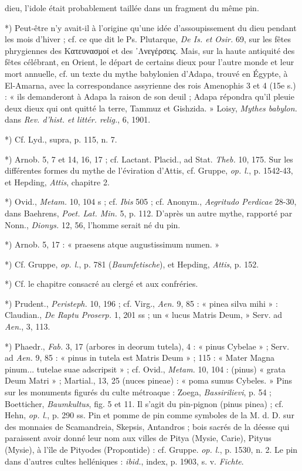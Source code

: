 \documentclass[a4paper, 11pt, oneside, polutonikogreek, french]{article}
\begin{document}
dieu, l'idole était probablement taillée dans un fragment du même pin.

*) Peut-être n'y avait-il à l'origine qu'une idée d'assoupissement du dieu pendant les mois d'hiver ; cf. ce que dit le Ps. Plutarque, \emph{De Is. et Osir.} 69, sur les fêtes phrygiennes des Kατευνασμοί et des ᾿Λνεγέρσεις. Mais, sur la haute antiquité des fêtes célébrant, en Orient, le départ de certains dieux pour l'autre monde et leur mort annuelle, cf. un texte du mythe babylonien d'Adapa, trouvé en Égypte, à El-Amarna, avec la correspondance assyrienne des rois Amenophis 3 et 4 (15e s.) : « ils demanderont à Adapa la raison de son deuil ; Adapa répondra qu'il pleuie deux dieux qui ont quitté la terre, Tammuz et Gishzida. » Loisy, \emph{Mythes babylon.} dans \emph{Rev. d'hist. et littér. relig.}, 6, 1901.

*) Cf. Lyd., supra, p. 115, n. 7.

*) Arnob. 5, 7 et 14, 16, 17 ; cf. Lactant. Placid., ad Stat. \emph{Theb.} 10, 175. Sur les différentes formes du mythe de l'éviration d'Attis, cf. Gruppe, \emph{op. l.}, p. 1542-43, et Hepding, \emph{Attis}, chapitre 2.

*) Ovid., \emph{Metam.} 10, 104 s ; cf. \emph{Ibis} 505 ; cf. Anonym., \emph{Aegritudo Perdicae} 28-30, dans Baehrens, \emph{Poet. Lat. Min.} 5, p. 112. D'après un autre mythe, rapporté par Nonn., \emph{Dionys.} 12, 56, l'homme serait né du pin.

*) Arnob. 5, 17 : « praesens atque augustissimum numen. »

*) Cf. Gruppe, \emph{op. l.}, p. 781 (\emph{Baumfetische}), et Hepding, \emph{Attis}, p. 152.

*) Cf. le chapitre consacré au clergé et aux confréries.

*) Prudent., \emph{Peristeph.} 10, 196 ; cf. Virg., \emph{Aen.} 9, 85 : « pinea silva mihi » : Claudian., \emph{De Raptu Proserp.} 1, 201 ss ; un « lucus Matris Deum, » Serv. ad \emph{Aen.}, 3, 113.

*) Phaedr., \emph{Fab.} 3, 17 (arbores in deorum tutela), 4 : « pinus Cybelae » ; Serv. ad \emph{Aen.} 9, 85 : « pinus in tutela est Matris Deum » ; 115 : « Mater Magna pinum... tutelae suae adscripsit » ; cf. Ovid., \emph{Metam.} 10, 104 : (pinus) « grata Deum Matri » ; Martial., 13, 25 (nuces pineae) : « poma sumus Cybeles. » Pins sur les monuments figurés du culte métroaque : Zoega, \emph{Bassirilievi}, p. 54 ; Boetticher, \emph{Baumkultus}, fig. 5 et 11. Il s'agit du pin-pignon (pinus pinea) ; cf. Hehn, \emph{op. l.}, p. 290 ss. Pin et pomme de pin comme symboles de la M. d. D. sur des monnaies de Scamandreia, Skepsis, Antandros ; bois sacrés de la déesse qui paraissent avoir donné leur nom aux villes de Pitya (Mysie, Carie), Pityus (Mysie), à l'île de Pityodes (Propontide) : cf. Gruppe. \emph{op. l.}, p. 1530, n. 2. Le pin dans d'autres cultes helléniques : \emph{ibid.}, index, p. 1903, s. v. \emph{Fichte}.
\end{document}

